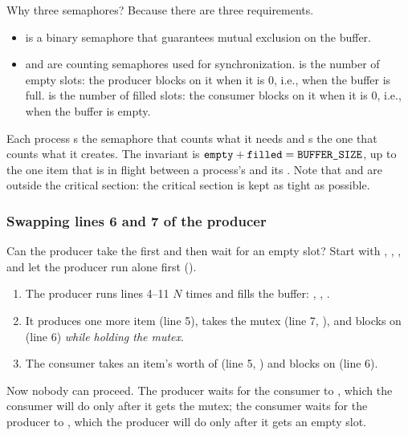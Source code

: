 Why three semaphores? Because there are three requirements.
\begin{itemize}
  \item {} is a binary semaphore that guarantees mutual exclusion on the buffer.
  \item {} and  are counting semaphores used for synchronization.  is the number of empty slots: the producer blocks on it when it is $0$, i.e., when the buffer is full.  is the number of filled slots: the consumer blocks on it when it is $0$, i.e., when the buffer is empty.
\end{itemize}
Each process s the semaphore that counts what it needs and s the one that counts what it creates. The invariant is $\texttt{empty} + \texttt{filled} = \texttt{BUFFER\_SIZE}$, up to the one item that is in flight between a process's  and its . Note that  and  are outside the critical section: the critical section is kept as tight as possible.

\subsubsection{Swapping lines 6 and 7 of the producer}
Can the producer take the  first and then wait for an empty slot? Start with , , , and let the producer run alone first ().
\begin{enumerate}
  \item The producer runs lines 4--11 $N$ times and fills the buffer: , , .
  \item It produces one more item (line 5), takes the mutex (line 7, ), and blocks on  (line 6) \emph{while holding the mutex}.
  \item The consumer takes an item's worth of  (line 5, ) and blocks on  (line 6).
\end{enumerate}
Now nobody can proceed. The producer waits for the consumer to , which the consumer will do only after it gets the mutex; the consumer waits for the producer to , which the producer will do only after it gets an empty slot.

